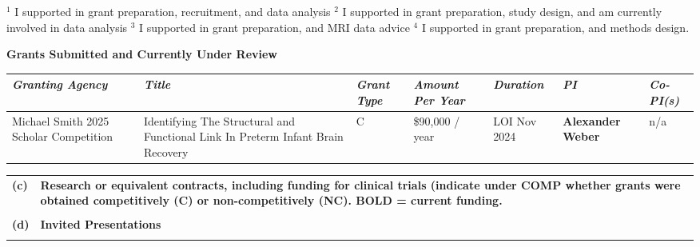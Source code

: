 \documentclass[11pt,notitlepage,english]{report}
\begin{document}
\setlength\LTleft{0cm}
\setlength\LTright{0cm}
\noindent $^{1}$ I supported in grant preparation, recruitment, and data analysis \newline
$^{2}$ I supported in grant preparation, study design, and am currently involved in data analysis \newline
$^{3}$ I supported in grant preparation, and MRI data advice \newline
$^{4}$ I supported in grant preparation, and methods design.
\vspace{10pt}

\textbf{Grants Submitted and Currently Under Review}

\begin{longtable}{|L{2cm}|L{3.6cm}|L{1cm}|L{2cm}|L{1.7cm}|L{2cm}|L{2cm}|}
  \hline
  \textit{\textbf{Granting Agency}} & \textit{\textbf{Title}} & \textit{\textbf{Grant Type}} & \textit{\textbf{Amount Per Year}} & \textit{\textbf{Duration}} & \textit{\textbf{PI}} & \textit{\textbf{Co-PI(s)}} \\
  \hline
  Michael Smith 2025 Scholar Competition & Identifying The Structural and Functional Link In Preterm Infant Brain Recovery & C & \$90,000 / year & LOI Nov 2024 & \textbf{Alexander Weber} & n/a \\
  \hline
\end{longtable}

\begin{tabular}{L{.5cm} L{15.6cm}}
  \\
  \textbf{(c)} & \textbf{Research or equivalent contracts, including funding for clinical trials (indicate under COMP whether grants were obtained competitively (C) or non-competitively (NC). BOLD = current funding.} \\
  \\
  \textbf{(d)} & \textbf{Invited Presentations} \\
  \\
\end{tabular}
\end{document}
